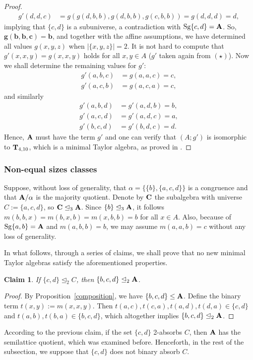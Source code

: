 \documentclass[11pt]{amsart}
\newcommand{\m}[1]{\mathbf{\uppercase{#1}}}
\theoremstyle{definition}
\theoremstyle{remark}
\theoremstyle{plain}
\newtheorem{claim}[thm]{Claim}
\begin{document}
\begin{proof}
\begin{equation*}
\begin{aligned}
    g'(d,d,c)&=g(g(d,b,b), g(d,b,b), g(c,b,b))=g(d,d,d)=d,
\end{aligned}
\end{equation*}
implying that $\{c,d\}$ is a subuniverse, a contradiction with $\mathrm{Sg}\{c,d\}=\m a$. So, $\mathbf{g(b,b,c)=b}$, and together with the affine assumptions, we have determined all values $g(x,y,z)$ when $|\{x,y,z\}|=2$. It is not hard to compute that $g'(x,x,y)=g(x,x,y)$ holds for all $x,y\in A$ ($g'$ taken again from $(\star)$). Now we shall determine the remaining values for $g'$:
\begin{align*}
    g'(a,b,c)&=g(a,a,c)=c,\\
    g'(a,c,b)&=g(a,c,a)=c,
\end{align*}
and similarly
\begin{align*}
    g'(a,b,d)&=g'(a,d,b)=b,\\
    g'(a,c,d)&=g'(a,d,c)=a,\\
    g'(b,c,d)&=g'(b,d,c)=d.
\end{align*}
Hence, $\m a$ must have the term $g'$ and one can verify that $(A;g')$ is isomorphic to $\m t_{4,10}$, which is a minimal Taylor algebra, as proved in . 
\end{proof}



\subsubsection{Non-equal sizes classes}

Suppose, without loss of generality, that $\alpha=\{\{b\},\{a,c,d\}\}$ is a congruence and that $\m a/\alpha$ is the majority quotient. Denote by $\m c$ the subalgebra with universe $C:=\{a,c,d\}$, so $\m C\trianglelefteq_3 \m a$. Since $\{b\}\trianglelefteq_3\m a$, it follows $m(b,b,x)=m(b,x,b)=m(x,b,b)=b$ for all $x\in A$. Also, because of $\mathrm{Sg}\{a,b\}=\m a$ and $m(a,b,b)=b$, we may assume $m(a,a,b)=c$ without any loss of generality.

In what follows, through a series of claims, we shall prove that no new minimal Taylor algebras satisfy the aforementioned properties.
\begin{claim}
 If $\{c,d\}\trianglelefteq_2 C$, then $\{b,c,d\}\trianglelefteq_2\m a$.   
\end{claim}

\begin{proof}
   By Proposition~\ref{composition}, we have $\{b,c,d\}\leq \m a$. Define the binary term $t(x,y):=m(x,x,y)$. Then $t(a,c),t(c,a),t(a,d),t(d,a)\in \{c,d\}$ and $t(a,b),t(b,a)\in \{b,c,d\}$, which altogether implies $\{b,c,d\}\trianglelefteq_2\m a$.
\end{proof}
According to the previous claim, if the set $\{c,d\}$ 2-absorbs $C$, then $\m a$ has the semilattice quotient, which was examined before. Henceforth, in the rest of the subsection, we suppose that $\{c,d\}$ does not binary absorb $C$.
\end{document}
